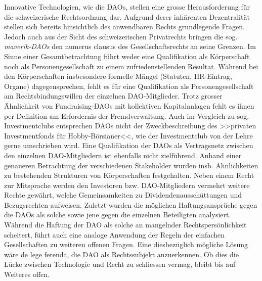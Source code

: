 \documentclass[a4paper,12pt]{report}
\begin{document}
	Innovative Technologien, wie die DAOs, stellen eine grosse Herausforderung für die schweizerische Rechtsordnung dar. Aufgrund derer inhärenten Dezentralität stellen sich bereits hinsichtlich des anwendbaren Rechts grundlegende Fragen. Jedoch auch aus der Sicht des schweizerischen Privatrechts bringen die sog. \textit{maverik-DAOs} den numerus clausus des Gesellschaftsrechts an seine Grenzen. Im Sinne einer Gesamtbetrachtung führt weder eine Qualifikation als Körperschaft noch als Personengesellschaft zu einem zufriedenstellenden Resultat. Während bei den Körperschaften insbesondere formelle Mängel (Statuten, HR-Eintrag, Organe) dagegensprechen, fehlt es für eine Qualifikation als Personengesellschaft am Rechtsbindungswillen der einzelnen DAO-Mitglieder. Trotz grosser Ähnlichkeit von Fundraising-DAOs mit kollektiven Kapitalanlagen fehlt es ihnen per Definition am Erfordernis der Fremdverwaltung. Auch im Vergleich zu sog. Investmentclubs entsprechen DAOs nicht der Zweckbeschreibung des >>privaten Investmentfonds für Hobby-Börsianer<<, wie der Investmentclub von der Lehre gerne umschrieben wird. Eine Qualifikation der DAOs als Vertragsnetz zwischen den einzelnen DAO-Mitgliedern ist ebenfalls nicht zielführend. Anhand einer genaueren Betrachtung der verschiedenen Stakeholder wurden insb. Ähnlichkeiten zu bestehenden Strukturen von Körperschaften festgehalten. Neben einem Recht zur Mitsprache werden den Investoren bzw. DAO-Mitgliedern vermehrt weitere Rechte gewährt, welche Gemeinsamkeiten zu Dividendenausschüttungen und Bezugsrechten aufweisen. Zuletzt wurden die möglichen Haftungsansprüche gegen die  DAOs als solche sowie jene gegen die einzelnen Beteiligten analysiert. Während die Haftung der DAO als solche an mangelnder Rechtspersönlichkeit scheitert, führt auch eine analoge Anwendung der Regeln der einfachen Gesellschaften zu weiteren offenen Fragen. Eine diesbezüglich mögliche Lösung wäre de lege ferenda, die DAO als Rechtssubjekt anzuerkennen. Ob dies die Lücke zwischen Technologie und Recht zu schliessen vermag, bleibt bis auf Weiteres offen.
	
	\revertgeometry
	\printbibliography[keyword={computerscience}, title=Bibliography]
	
	\newpage
\end{document}
